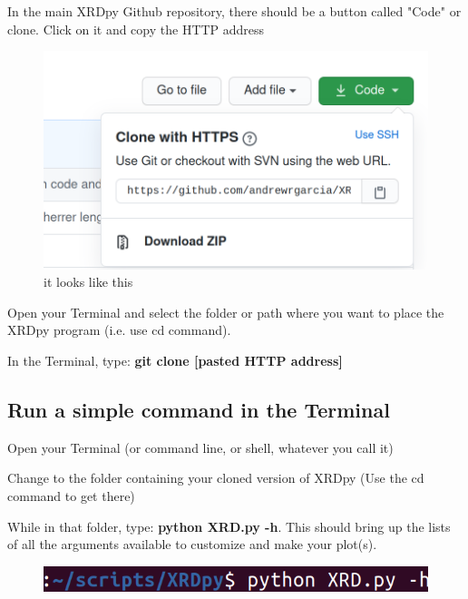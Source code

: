 \documentclass{article}
\begin{document}
\begin{description}
\item In the main XRDpy Github repository, there should be a button called "Code" or clone. Click on it and copy the HTTP address

\begin{figure}[htbp]
\centerline{\includegraphics[scale=.35]{clone.png}}
\caption {it looks like this}
\label{fig2}
\end{figure}

\item Open your Terminal and select the folder or path where you want to place the XRDpy program (i.e. use cd command).
\item In the Terminal, type: \textbf{git clone [pasted HTTP address]}

\end{description}


\subsection{Run a simple command in the Terminal}

\begin{description}
\item Open your Terminal (or command line, or shell, whatever you call it)
\item Change to the folder containing your cloned version of XRDpy (Use the cd command to get there)
\item While in that folder, type: \textbf{python XRD.py -h}. This should bring up the lists of all the arguments available to customize and make your plot(s).

\begin{figure}[htbp]
\centerline{\includegraphics[scale=.35]{xrd-h.png}}
\label{fig3}
\end{figure}

\end{description}
\end{document}
